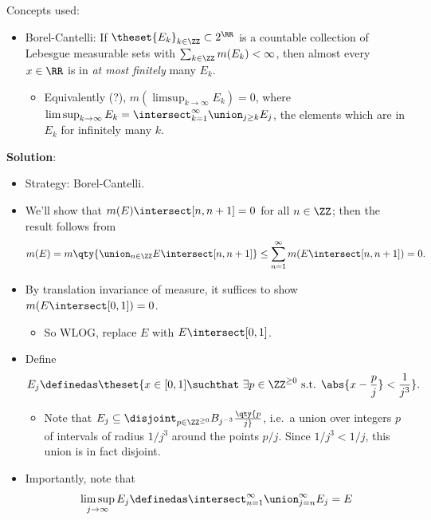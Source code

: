 \begin{solution}

Concepts used:

\begin{itemize}
\tightlist
\item
  Borel-Cantelli: If \(\theset{E_k}_{k\in\ZZ}\subset 2^\RR\) is a
  countable collection of Lebesgue measurable sets with
  \(\sum_{k\in \ZZ} m(E_k) < \infty\), then almost every \(x\in \RR\) is
  in \emph{at most finitely} many \(E_k\).

  \begin{itemize}
  \tightlist
  \item
    Equivalently (?), \(m(\limsup_{k\to\infty} E_k) = 0\), where
    \(\limsup_{k\to\infty} E_k = \intersect_{k=1}^\infty \union_{j\geq k} E_j\),
    the elements which are in \(E_k\) for infinitely many \(k\).
  \end{itemize}
\end{itemize}

\textbf{Solution}:

\begin{itemize}
\item
  Strategy: Borel-Cantelli.
\item
  We'll show that \(m(E) \intersect [n, n+1] = 0\) for all \(n\in \ZZ\);
  then the result follows from
  \begin{align*}
  m(E) = m \qty{\union_{n\in \ZZ} E \intersect [n, n+1]} \leq \sum_{n=1}^\infty m(E \intersect [n, n+1]) = 0
  .\end{align*}
\item
  By translation invariance of measure, it suffices to show
  \(m(E \intersect [0, 1]) = 0\).

  \begin{itemize}
  \tightlist
  \item
    So WLOG, replace \(E\) with \(E\intersect [0, 1]\).
  \end{itemize}
\item
  Define
  \begin{align*}
  E_j \definedas \theset{x\in [0, 1] \suchthat \
  \exists p\in \ZZ^{\geq 0} \text{ s.t. } \abs{x - \frac{p}{j} } < \frac 1 {j^3}} 
  .\end{align*}

  \begin{itemize}
  \tightlist
  \item
    Note that
    \(E_j \subseteq \disjoint_{p\in \ZZ^{\geq 0}} B_{j^{-3}}\qty{p\over j}\),
    i.e.~a union over integers \(p\) of intervals of radius \(1/j^3\)
    around the points \(p/j\). Since \(1/j^3 < 1/j\), this union is in
    fact disjoint.
  \end{itemize}
\item
  Importantly, note that
  \begin{align*}
  \limsup_{j\to\infty} E_j \definedas \intersect_{n=1}^\infty \union_{j=n}^\infty E_j = E
  \end{align*}


\end{itemize}
\end{solution}
